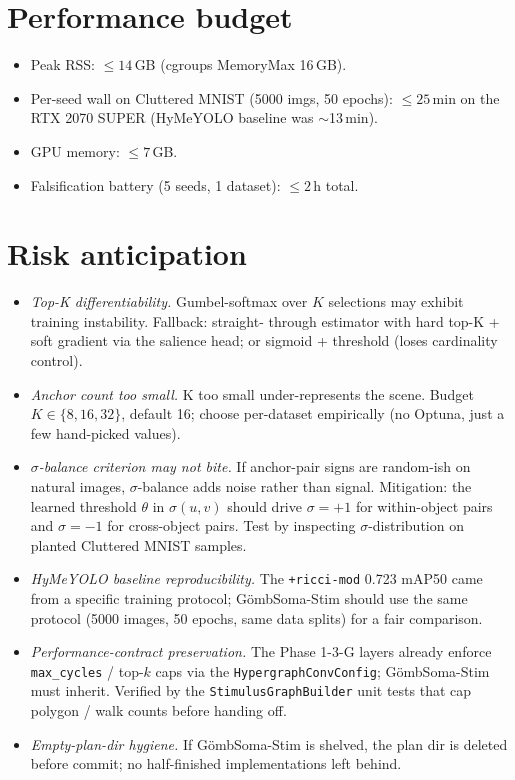 \documentclass[11pt,a4paper]{article}
\newcommand{\sig}{\ensuremath{\sigma}}
\newcommand{\Soma}{G\"ombSoma}
\newcommand{\Stim}{\Soma-Stim}
\begin{document}
\section{Performance budget}

\begin{itemize}
\item Peak RSS: $\leq 14$\,GB (cgroups MemoryMax 16\,GB).
\item Per-seed wall on Cluttered MNIST (5000 imgs, 50 epochs): $\leq 25$\,min on the RTX 2070 SUPER (HyMeYOLO baseline was $\sim$13\,min).
\item GPU memory: $\leq 7$\,GB.
\item Falsification battery (5 seeds, 1 dataset): $\leq 2$\,h total.
\end{itemize}

\section{Risk anticipation}

\begin{itemize}
\item \emph{Top-K differentiability.} Gumbel-softmax over $K$
  selections may exhibit training instability. Fallback: straight-
  through estimator with hard top-K + soft gradient via the salience
  head; or sigmoid + threshold (loses cardinality control).

\item \emph{Anchor count too small.} K too small under-represents
  the scene. Budget $K \in \{8, 16, 32\}$, default 16; choose
  per-dataset empirically (no Optuna, just a few hand-picked values).

\item \emph{$\sig$-balance criterion may not bite.} If anchor-pair
  signs are random-ish on natural images, $\sig$-balance adds noise
  rather than signal. Mitigation: the learned threshold $\theta$
  in $\sig(u, v)$ should drive $\sig = +1$ for within-object pairs
  and $\sig = -1$ for cross-object pairs. Test by inspecting
  $\sig$-distribution on planted Cluttered MNIST samples.

\item \emph{HyMeYOLO baseline reproducibility.} The
  \texttt{+ricci-mod} 0.723 mAP50 came from a specific training
  protocol; \Stim{} should use the same protocol (5000 images,
  50 epochs, same data splits) for a fair comparison.

\item \emph{Performance-contract preservation.} The Phase 1-3-G
  layers already enforce \texttt{max\_cycles} / top-$k$ caps via the
  \texttt{HypergraphConvConfig}; \Stim{} must inherit. Verified by
  the \texttt{StimulusGraphBuilder} unit tests that cap polygon /
  walk counts before handing off.

\item \emph{Empty-plan-dir hygiene.} If \Stim{} is shelved, the
  plan dir is deleted before commit; no half-finished implementations
  left behind.
\end{itemize}
\end{document}
